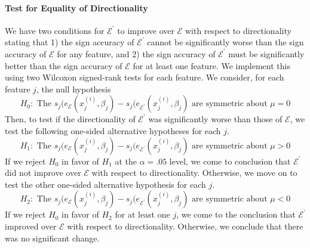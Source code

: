 \documentclass[mnsc,blindrev]{informs3}
\newcommand{\mE}{\mathcal{E}}
\begin{document}
            \paragraph{Test for Equality of Directionality}        We have two conditions for $\mE^\prime$ to improve over $\mE$ with respect to directionality stating that 1) the sign accuracy of $\mE^\prime$ cannot be significantly worse than the sign accuracy of $\mE$ for any feature, and 2) the sign accuracy of $\mE^\prime$ must be significantly better than the sign accuracy of $\mE$ for at least one feature. We implement this using two Wilcoxon signed-rank tests for each feature. We consider, for each feature $j$, the null hypothesis
            \begin{equation*}
                H_0: \text{ The } s_j(e_\mE(x_j^{(i)},\beta_j) - s_j(e_{\mE^\prime}(x_j^{(i)},\beta_j) \text{ are symmetric about } \mu = 0
            \end{equation*}
            Then, to test if the directionality of $\mE^\prime$ was significantly worse than those of $\mE$, we test the following one-sided alternative hypotheses for each $j$.
            \begin{equation*}
                H_1: \text{ The } s_j(e_\mE(x_j^{(i)},\beta_j) - s_j(e_{\mE^\prime}(x_j^{(i)},\beta_j) \text{ are symmetric about } \mu > 0
            \end{equation*}
            If we reject $H_0$ in favor of $H_1$ at the $\alpha=.05$ level, we come to conclusion that $\mE^{\prime}$ did not improve over $\mE$ with respect to directionality. Otherwise, we move on to test the other one-sided alternative hypothesis for each $j$.
            \begin{equation*}
                H_2: \text{ The }  s_j(e_\mE(x_j^{(i)},\beta_j) - s_j(e_{\mE^\prime}(x_j^{(i)},\beta_j) \text{ are symmetric about } \mu < 0
            \end{equation*}
            If we reject $H_0$ in favor of $H_2$ for at least one $j$, we come to the conclusion that $\mE^{\prime}$ improved over $\mE$ with respect to directionality. Otherwise, we conclude that there was no significant change. 
            
\end{document}
